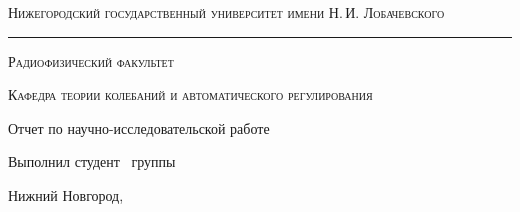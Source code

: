 \begin{titlepage}
	
	\begin{center}
		
		{\small\textsc{Нижегородский государственный университет имени Н.\,И. Лобачевского}}
		\vskip 1pt \hrule \vskip 3pt
		{\small\textsc{Радиофизический факультет}}
		
		{\small\textsc{Кафедра теории колебаний и автоматического регулирования}}
		
		
		
		\vfill
		
		{\Large Отчет по научно-исследовательской работе \vskip 12pt\bfseries \labtheme}
		
	\end{center}
	
	\vfill
	
	\begin{flushright}
		{Выполнил студент \labgroup\ группы\\ \labauthor}
	\end{flushright}
	
	\vfill
	
	\begin{center}
		Нижний Новгород, \the\year
	\end{center}
	
\end{titlepage}
